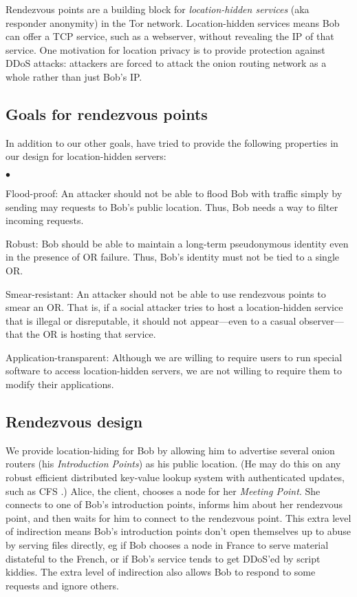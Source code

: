 \documentclass[times,10pt,twocolumn]{article}
\newenvironment{tightlist}{\begin{list}{$\bullet$}{
  \setlength{\itemsep}{0mm}
    \setlength{\parsep}{0mm}
    }}{\end{list}}
\begin{document}
\label{sec:rendezvous}

Rendezvous points are a building block for \emph{location-hidden services}
(aka responder anonymity) in the Tor network. Location-hidden services
means Bob can offer a TCP service, such as a webserver, without revealing
the IP of that service. One motivation for location privacy is to provide
protection against DDoS attacks: attackers are forced to attack the
onion routing network as a whole rather than just Bob's IP.

\subsection{Goals for rendezvous points}
\label{subsec:rendezvous-goals}
In addition to our other goals, have tried to provide the following
properties in our design for location-hidden servers:
\begin{tightlist}
\item[Flood-proof:] An attacker should not be able to flood Bob with traffic
  simply by sending may requests to Bob's public location.  Thus, Bob needs a
  way to filter incoming requests.
\item[Robust:] Bob should be able to maintain a long-term pseudonymous
  identity even in the presence of OR failure.  Thus, Bob's identity must not
  be tied to a single OR.
\item[Smear-resistant:] An attacker should not be able to use rendezvous
  points to smear an OR.  That is, if a social attacker tries to host a 
  location-hidden service that is illegal or disreputable, it should not
  appear---even to a casual observer---that the OR is hosting that service.
\item[Application-transparent:] Although we are willing to require users to
  run special software to access location-hidden servers, we are not willing
  to require them to modify their applications.
\end{tightlist}

\subsection{Rendezvous design}
We provide location-hiding for Bob by allowing him to advertise several onion
routers (his \emph{Introduction Points}) as his public location.  (He may do
this on any robust efficient distributed key-value lookup system with
authenticated updates, such as CFS \cite{cfs:sosp01}.)
Alice, the client, chooses a node for her \emph{Meeting
Point}. She connects to one of Bob's introduction points, informs him
about her rendezvous point, and then waits for him to connect to the
rendezvous
point. This extra level of indirection means Bob's introduction points
don't open themselves up to abuse by serving files directly, eg if Bob
chooses a node in France to serve material distateful to the French,
%
%
or if Bob's service tends to get DDoS'ed by script kiddies.
The extra level of indirection also allows Bob to respond to some requests
and ignore others.
\end{document}
